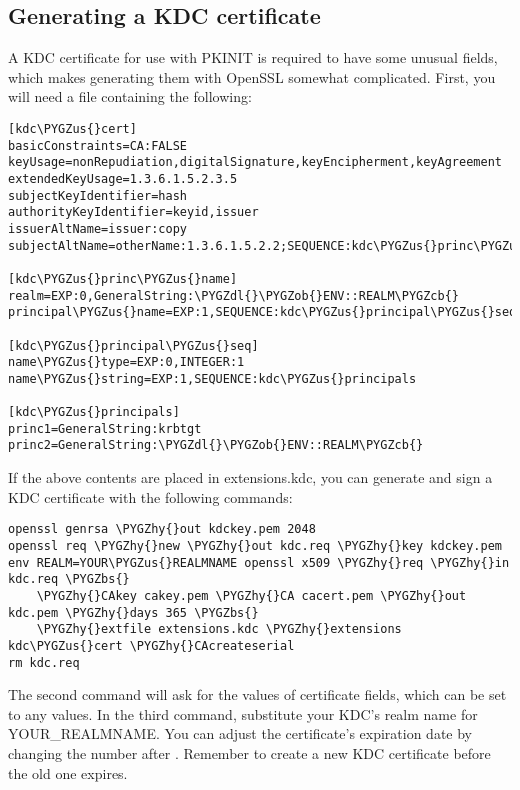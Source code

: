 \documentclass[letterpaper,10pt,english]{sphinxmanual}
\def\PYGZbs{\char`\\}
\def\PYGZus{\char`\_}
\def\PYGZob{\char`\{}
\def\PYGZcb{\char`\}}
\def\PYGZdl{\char`\$}
\def\PYGZhy{\char`\-}
\begin{document}
\subsection{Generating a KDC certificate}
\label{admin/pkinit:generating-a-kdc-certificate}
A KDC certificate for use with PKINIT is required to have some unusual
fields, which makes generating them with OpenSSL somewhat complicated.
First, you will need a file containing the following:

\begin{Verbatim}[commandchars=\\\{\}]
[kdc\PYGZus{}cert]
basicConstraints=CA:FALSE
keyUsage=nonRepudiation,digitalSignature,keyEncipherment,keyAgreement
extendedKeyUsage=1.3.6.1.5.2.3.5
subjectKeyIdentifier=hash
authorityKeyIdentifier=keyid,issuer
issuerAltName=issuer:copy
subjectAltName=otherName:1.3.6.1.5.2.2;SEQUENCE:kdc\PYGZus{}princ\PYGZus{}name

[kdc\PYGZus{}princ\PYGZus{}name]
realm=EXP:0,GeneralString:\PYGZdl{}\PYGZob{}ENV::REALM\PYGZcb{}
principal\PYGZus{}name=EXP:1,SEQUENCE:kdc\PYGZus{}principal\PYGZus{}seq

[kdc\PYGZus{}principal\PYGZus{}seq]
name\PYGZus{}type=EXP:0,INTEGER:1
name\PYGZus{}string=EXP:1,SEQUENCE:kdc\PYGZus{}principals

[kdc\PYGZus{}principals]
princ1=GeneralString:krbtgt
princ2=GeneralString:\PYGZdl{}\PYGZob{}ENV::REALM\PYGZcb{}
\end{Verbatim}

If the above contents are placed in extensions.kdc, you can generate
and sign a KDC certificate with the following commands:

\begin{Verbatim}[commandchars=\\\{\}]
openssl genrsa \PYGZhy{}out kdckey.pem 2048
openssl req \PYGZhy{}new \PYGZhy{}out kdc.req \PYGZhy{}key kdckey.pem
env REALM=YOUR\PYGZus{}REALMNAME openssl x509 \PYGZhy{}req \PYGZhy{}in kdc.req \PYGZbs{}
    \PYGZhy{}CAkey cakey.pem \PYGZhy{}CA cacert.pem \PYGZhy{}out kdc.pem \PYGZhy{}days 365 \PYGZbs{}
    \PYGZhy{}extfile extensions.kdc \PYGZhy{}extensions kdc\PYGZus{}cert \PYGZhy{}CAcreateserial
rm kdc.req
\end{Verbatim}

The second command will ask for the values of certificate fields,
which can be set to any values.  In the third command, substitute your
KDC's realm name for YOUR\_REALMNAME.  You can adjust the certificate's
expiration date by changing the number after .  Remember to
create a new KDC certificate before the old one expires.
\end{document}

